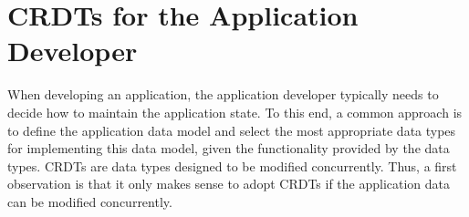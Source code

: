 \documentclass[12pt]{article}
\begin{document}
%
%


\section{CRDTs for the Application Developer}\label{sec:appdev}

When developing an application, the application developer typically needs to decide 
how to maintain the application state. 
To this end, a common approach is to define the application data model and select 
the most appropriate data types for implementing this data model, given the 
functionality provided by the data types. 
CRDTs are data types designed to be modified concurrently. 
Thus, a first observation is that it only makes sense to adopt CRDTs if the 
application data can be modified concurrently.
\end{document}
